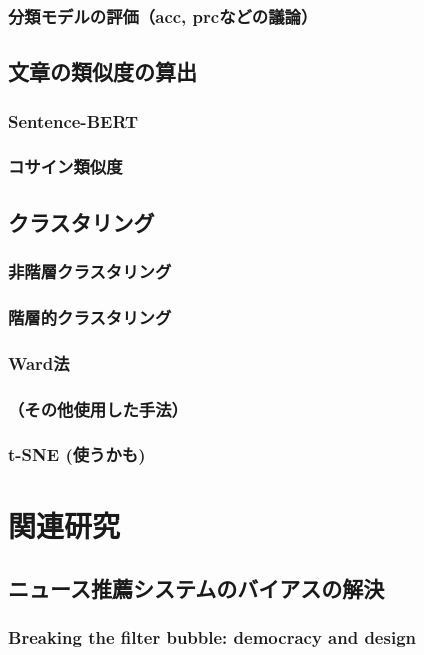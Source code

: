 \documentclass[12pt,a4j]{jreport}
\begin{document}
    \subsection{分類モデルの評価（acc, prcなどの議論）}
\section{文章の類似度の算出}
    \subsection{Sentence-BERT}
    \subsection{コサイン類似度}
\section{クラスタリング}
    \subsection{非階層クラスタリング}
    \subsection{階層的クラスタリング}
    \subsection{Ward法}
    \subsection{（その他使用した手法）}
    \subsection{t-SNE (使うかも)}


\chapter{関連研究}

\section{ニュース推薦システムのバイアスの解決}
    \subsection{Breaking the filter bubble: democracy and design}
\end{document}
